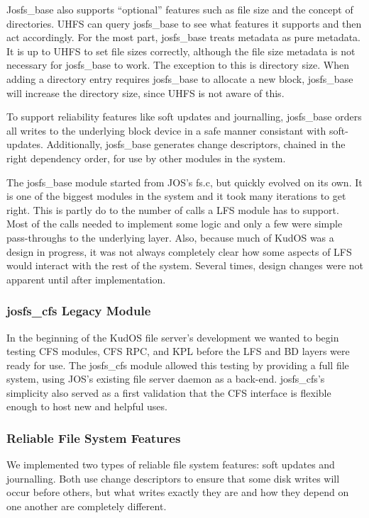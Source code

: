 Josfs\_base also supports ``optional'' features such as file size and the
concept of directories. UHFS can query josfs\_base to see what features it
supports and then act accordingly. For the most part, josfs\_base treats
metadata as pure metadata. It is up to UHFS to set file sizes correctly,
although the file size metadata is not necessary for josfs\_base to work. The
exception to this is directory size. When adding a directory entry requires
josfs\_base to allocate a new block, josfs\_base will increase the directory
size, since UHFS is not aware of this.

To support reliability features like soft updates \cite{ganger00soft} and
journalling, josfs\_base orders all writes to the underlying block device in a
safe manner consistant with soft-updates. Additionally, josfs\_base generates
change descriptors, chained in the right dependency order, for use by other
modules in the system.

The josfs\_base module started from JOS's fs.c, but quickly evolved on its own.
It is one of the biggest modules in the system and it took many iterations to
get right. This is partly do to the number of calls a LFS module has to support.
Most of the calls needed to implement some logic and only a few were simple
pass-throughs to the underlying layer. Also, because much of KudOS was a design
in progress, it was not always completely clear how some aspects of LFS would
interact with the rest of the system. Several times, design changes were not
apparent until after implementation.

\subsubsection{josfs\_cfs Legacy Module}

In the beginning of the KudOS file server's development we wanted to begin
testing CFS modules, CFS RPC, and KPL before the LFS and BD layers were ready
for use. The josfs\_cfs module allowed this testing by providing a full file
system, using JOS's existing file server daemon as a back-end. josfs\_cfs's
simplicity also served as a first validation that the CFS interface is flexible
enough to host new and helpful uses.

\subsubsection{Reliable File System Features}

We implemented two types of reliable file system features: soft updates and
journalling. Both use change descriptors to ensure that some disk writes will
occur before others, but what writes exactly they are and how they depend on one
another are completely different.

